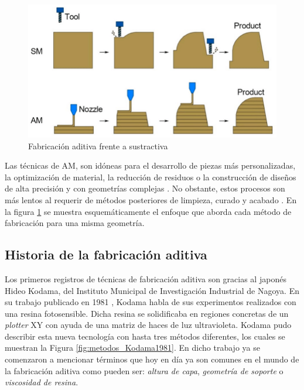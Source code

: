 \begin{figure}[h!]
    \centering
    \includegraphics[scale=0.25]{figuras/sm_vs_am.png}
    \caption{Fabricación aditiva frente a sustractiva \cite{Tao2021}}
    \label{fig:aditiva_vs_sustractiva}
\end{figure}

Las técnicas de \acrshort{AM}, son idóneas para el desarrollo de piezas más personalizadas, la optimización de material, la reducción de residuos o la construcción de diseños de alta precisión y con geometrías complejas \cite{Li_2020} \cite{Rashid_2024}\cite{Loyda_2023}. No obstante, estos procesos son más lentos al requerir de métodos posteriores de limpieza, curado y acabado \cite{AMvsSM_Dasult}. En la figura \ref{fig:aditiva_vs_sustractiva} se muestra esquemáticamente el enfoque que aborda cada método de fabricación para una misma geometría. 

\subsection{Historia de la fabricación aditiva}
Los primeros registros de técnicas de fabricación aditiva son gracias al japonés Hideo Kodama, del Instituto Municipal de Investigación Industrial de Nagoya. En su trabajo publicado en 1981 \cite{Kodama1981}, Kodama habla de sus experimentos realizados con una resina fotosensible. Dicha resina se solidificaba en regiones concretas de un \textit{plotter} XY con ayuda de una matriz de haces de luz ultravioleta. Kodama pudo describir esta nueva tecnología con hasta tres métodos diferentes, los cuales se muestran la Figura \ref{fig:metodos_Kodama1981}. En dicho trabajo ya se comenzaron a mencionar términos que hoy en día ya son comunes en el mundo de la fabricación aditiva como pueden ser: \textit{altura de capa}, \textit{geometría de soporte} o \textit{viscosidad de resina}. 

